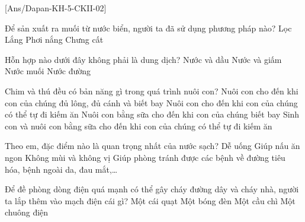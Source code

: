 \def\myytb{}
\def\myqrcodeytb{}
\def\myqrcodezalo{}
\def\quetmaqr{}
\def\thamgianhomhoctap{}
\newpage
\setcounter{ex}{0}
[Ans/Dapan-KH-5-CKII-02]
\hienthiloigiaiex
{}
\begin{ex}[0,5 điểm]
	Để sản xuất ra muối từ nước biển, người ta đã sử dụng phương pháp nào?
	\choice
	{Lọc}
	{Lắng}
	{\True Phơi nắng}
	{Chưng cất}
	\loigiai{}
\end{ex}
\begin{ex}[0,5 điểm]Hỗn hợp nào dưới đây không phải là dung dịch?
\choice
{\True Nước và dầu}
{Nước và giấm}
{Nước muối}
{Nước đường}
\loigiai{}
\end{ex}
\begin{ex}[0,5 điểm]Chim và thú đều có bản năng gì trong quá trình nuôi con? 
\choice
{Nuôi con cho đến khi con của chúng đủ lông, đủ cánh và biết bay}
{\True Nuôi con cho đến khi con của chúng có thể tự đi kiếm ăn}
{Nuôi con bằng sữa cho đến khi con của chúng biết bay}
{Sinh con và nuôi con bằng sữa cho đến khi con của chúng có thể tự đi kiếm ăn}
\loigiai{}
\end{ex}
\begin{ex}[0,5 điểm]Theo em, đặc điểm nào là quan trọng nhất của nước sạch? 
\choice
{Dễ uống}
{Giúp nấu ăn ngon}
{Không mùi và không vị}
{\True Giúp phòng tránh được các bệnh về đường tiêu hóa, bệnh ngoài da, đau mắt,\ldots}
\loigiai{}
\end{ex}
\begin{ex}[1 điểm]Để đề phòng dòng điện quá mạnh có thể gây cháy đường dây và cháy nhà, người ta lắp thêm vào mạch điện cái gì?
\choice
{Một cái quạt}
{Một bóng đèn}
{\True Một cầu chì}
{Một chuông điện}
\loigiai{}
\end{ex}

